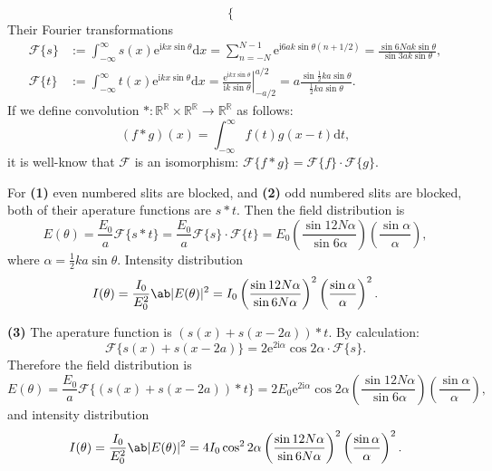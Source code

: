 \documentclass[11pt, twoside]{article}   	%
\theoremstyle{plain}
\theoremstyle{definition}
\begin{document}
\begin{description}
\begin{equation}
\begin{cases}
				\end{cases}
			\end{equation}
			Their Fourier transformations
			\begin{align}
				\mathscr F\{s\} &:= \int_{-\infty}^\infty s(x) \mathrm e^{\mathrm{i}k x \sin\theta}
				\mathrm{d} x = \sum_{n = -N}^{N - 1} \mathrm e^{\mathrm{i}6ak\sin\theta (n + 1/2)} =
				\frac{\sin 6Nak\sin\theta}{\sin 3ak\sin\theta},\\
				\mathscr F\{t\} &:= \int_{-\infty}^\infty t(x) \mathrm e^{\mathrm{i}k x \sin\theta}
				\mathrm{d} x = \left. \frac{\mathrm e^{\mathrm{i}k x \sin\theta}}{\mathrm{i}k \sin
				\theta} \right|_{-a/2}^{a/2} = a \frac{\sin\frac{1}{2} k a \sin\theta}{\frac{1}{2}
				k a \sin\theta}.
			\end{align}
			If we define convolution $*: \mathbb R^{\mathbb R} \times \mathbb R^{\mathbb R} \to
			\mathbb R^{\mathbb R}$ as follows:
			\begin{equation}
				(f * g)(x) = \int_{-\infty}^\infty f(t) g(x-t) \mathrm{d} t,
			\end{equation}
			it is well-know that $\mathscr F$ is an isomorphism: $\mathscr F\{f * g\} =
			\mathscr F\{f\} \cdot \mathscr F\{g\}$.

			For \textbf{(1)} even numbered slits are blocked, and \textbf{(2)} odd numbered slits
			are blocked, both of their aperature functions are $s * t$. Then the field distribution
			is
			\begin{equation}
				E(\theta) = \frac{E_0}{a} \mathscr F\{s * t\} = \frac{E_0}{a} \mathscr F\{s\} \cdot
				\mathscr F\{t\} = E_0 \left( \frac{\sin 12N\alpha}{\sin 6\alpha} \right)
				\left( \frac{\sin\alpha}{\alpha} \right),
			\end{equation}
			where $\alpha = \frac{1}{2}k a \sin\theta$. Intensity distribution
			\begin{equation}
				I(\theta) = \frac{I_0}{E_0^2} \ab|E(\theta)|^2 = I_0 \left( \frac{\sin12N\alpha}{
				\sin6N\alpha} \right)^2 \left( \frac{\sin\alpha}{\alpha} \right)^2.
			\end{equation}

			\textbf{(3)} The aperature function is $(s(x) + s(x - 2a)) * t$. By calculation:
			\begin{equation}
				\mathscr F\{s(x) + s(x - 2a)\} = 2 \mathrm e^{2\mathrm{i}\alpha} \cos2\alpha \cdot
				\mathscr F\{s\}.
			\end{equation}
			Therefore the field distribution is
			\begin{equation}
				E(\theta) = \frac{E_0}{a} \mathscr F\{(s(x) + s(x - 2a)) * t\} = 2 E_0 \mathrm e^{2
				\mathrm{i}\alpha} \cos2\alpha \left( \frac{\sin 12N\alpha}{\sin 6\alpha} \right)
				\left( \frac{\sin\alpha}{\alpha} \right),
			\end{equation}
			and intensity distribution
			\begin{equation}
				I(\theta) = \frac{I_0}{E_0^2} \ab|E(\theta)|^2 = 4 I_0 \cos^2 2\alpha \left( \frac{
				\sin12N\alpha}{\sin6N\alpha} \right)^2 \left( \frac{\sin\alpha}{\alpha} \right)^2.
			\end{equation}


\end{description}
\end{document}
